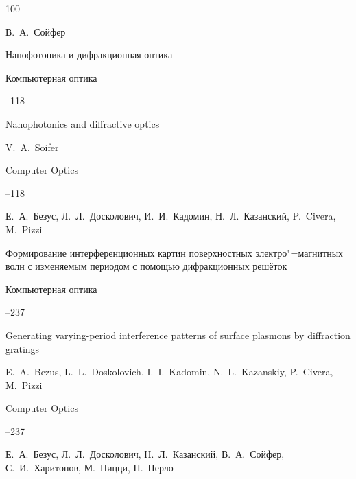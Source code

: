 \begin{thebibliography}{100}

\by В.~А.~Сойфер

\paper Нанофотоника и дифракционная оптика

\jour Компьютерная оптика




--118

\misctransl

\paper Nanophotonics and diffractive optics 

\by V.~A.~Soifer

\jour Computer Optics




--118








\by Е.~А.~Безус, Л.~Л.~Досколович, И.~И.~Кадомин, Н.~Л.~Казанский, P.~Civera, M.~Pizzi

\paper Формирование интерференционных картин поверхностных электро"=магнитных волн с изменяемым периодом с помощью дифракционных решёток

\jour Компьютерная оптика




--237

\misctransl

\paper Generating varying-period interference patterns of surface plasmons by diffraction gratings 

\by E.~A.~Bezus, L.~L.~Doskolovich, I.~I.~Kadomin, N.~L.~Kazanskiy, P.~Civera, M.~Pizzi

\jour Computer Optics




--237








\by Е.~А.~Безус, Л.~Л.~Досколович, Н.~Л.~Казанский, В.~А.~Сойфер, С.~И.~Харитонов, М.~Пицци, П.~Перло


\end{thebibliography}

